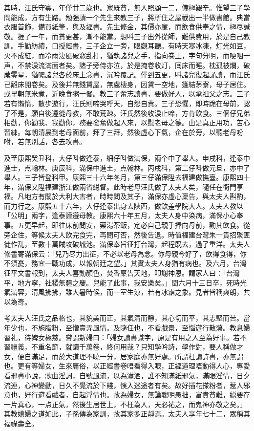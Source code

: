 \documentclass[a5paper, 12pt, openany]{book} %
\begin{document}
	其時，汪氏守寡，年僅廿二歲也。家既貧，無人照顧一二，備極艱辛。惟望三子學問能成，方有生路。勉强請一个先生來教三子，將所住之屋截出一半做書館。典當衣服首飾，備買紙筆，與及經書。先生修金，其價亦廉，而飲食供奉之情，極尽誠敬。捱了一年，而貧更甚，漸不能當。想呌三子出外從師，難供費用，於是自己教訓。手勤紡績，口授經書，三子企立一旁，眼觀耳聽。有時天寒冰凍，灯光如豆，火不成紅，而冷雨淒風破窓乱打，猶執諸兒之手，指向卷上，字句分明，而哽咽一声，不禁淚流滿面者矣。諸子旁侍亦泣，於是掩卷收灯，囘床而睡。枕孤被爛，破蓆零星，猶囑諸兒各於床上念書，沉吟覆記。僅到五更，呌諸兒復起誦讀，而汪氏已離床開卷矣。及後并無錢賃屋，無處棲身，因賃一空地，篷結茅寮，母子居住。或早朝無米煮，近晚食粥一餐。教三子奮志讀書，要做好人，以承祖父之志。三子若有懶惰，散步遊行，汪氏則啼哭呼天，自怨自責。三子恐懼，即時跪在母前，認了不是，願自後遵從母教，不敢荒疎。汪氏然後收淚止啼，方肯飲食。三個仔兄弟相勸，你勸我、我勸你，務要發奮做起人來，以慰老母之德。由是真正用功，苦心習練。每朝清晨到老母面前，拜了三拜，然後虛心下氣，企在於旁，以聽老母吩咐，若無別話，各去攻書。

	及至康熙癸丑科，大仔呌做逢泰，細仔呌做滿保，兩个中了舉人。申戌科，逢泰中進士，点翰林。庚辰科，滿保中進土，点翰林。丙戌科，第二仔呌做元旦，亦中了舉人。三子皆登科甲。康熙三十六年冬月，第三仔滿保陞去福建做撫臺。康熙四十年，滿保又陞福建浙江做兩省縂督。此時老母汪氏做了太夫人矣，隨任在衙門享福。凡地方有關於大利大害者，時時問及其子，滿保亦虛心稟告，與太夫人斟酌，而力行之。康熙五十六年，大仔逢泰出身去陝西，做欽差學院大人。太夫人教以「公明」兩字，逢泰謹遵母教。康熙六十年五月，太夫人身中染病，滿保小心奉事。五更早起，即往床前問安，藥湯茶飯，定必自己親手捧向母前，勸其飲食。從旁企住，等候太夫人飲完食完，再問可否，然後告退。時值福建台灣朱一貴招聚匪徒作乱，至數十萬賊攻破城池。滿保奉旨征打台灣，起程既去，過了重洋。太夫人修書寄滿保云：「兒乃尽力出征，不必以老母為念。你母親今好了，飲得食得，你不須憂，務宜一戰功成，以報朝廷之望。」其實太夫人身猶有病也。及六月，台灣征平文書報到，太夫人喜動顏色，焚香稟告天地，叩謝神恩。謂家人曰：「台灣平，地方寧，社稷無疆之慶。兒能了此事，我安樂矣。」閏六月十三日卒，死時光氣滿容，清風拂拂，雖大暑時候，而一室生涼，若有冰霜之象。見者皆稱爽朗，共以為奇。

	考太夫人汪氏之品格也，其貌美而正，其氣清而靜，其心切而平，其志堅而苦。當年少也，不施脂粉，至憎賣弄風情。及隨任也，不看戲景，至惱遊行散蕩。教息婦習礼，待婢女極慈。嘗謂新婦曰：「婦女讀書識字，原是有用之人至為好事。若不習禮義，不重名節，就讀千萬卷，終何用哉？只知學吟詩，學作對，要人稱做才女，便自滿足，而於大道理不曉一分，居家庭亦無好處。所謂枉讀詩書，亦無謂也。更有等婦女，生來庸俗，以正經書卷唔看得入眼，正經道理唔動得人心，專愛看邪書小說，歌曲淫詞，自號風流，以為瀟洒，誰不知滿紙邪氣，滿眼淫情，日夕流連，心神變動，日久不覺流於下賤，悞入迷途者有矣。故好插花搽粉者，惹人邪意也，好行遊看戲者，自起浮情也。故為婦女，無論聰明愚拙，富貴貧難，縂要存一片真心，一点正氣，然後生居世上，不枉為人，天必祐之，而鬼神亦敬之矣。」其教媳婦之道如此，子孫傳為家訓，故其家多正靜焉。太夫人享年七十二，眾稱其福祿壽全。
\end{document}
